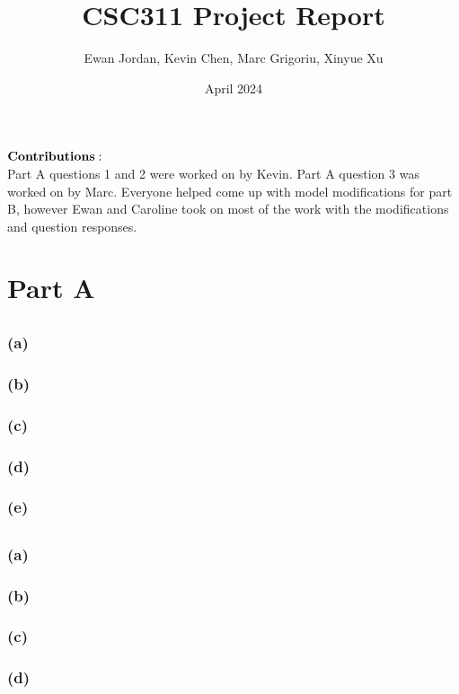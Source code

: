 \documentclass{article}
\title{CSC311 Project Report}
\author{Ewan Jordan, Kevin Chen, Marc Grigoriu, Xinyue Xu}
\date{April 2024}
\begin{document}
\maketitle
$\bold{Contributions:}$\\
Part A questions 1 and 2 were worked on by Kevin. Part A question 3 was worked on by Marc. Everyone helped come up with model modifications for part B, however Ewan and Caroline took on most of the work with the modifications and question responses.
\section{Part A}
\subsection{}
\subsubsection{(a)}
\subsubsection{(b)}
\subsubsection{(c)}
\subsubsection{(d)}
\subsubsection{(e)}
\subsection{}
\subsubsection{(a)}
\subsubsection{(b)}
\subsubsection{(c)}
\subsubsection{(d)}
\end{document}
